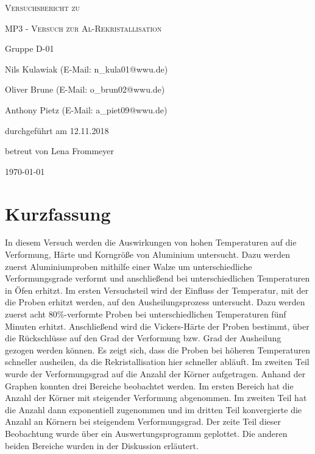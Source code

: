 \documentclass[
	a4paper,
	12pt,
	pagesize,
	ngerman
]{scrartcl}
\begin{document}
\begin{titlepage}
	\centering
	{\scshape\LARGE Versuchsbericht zu \par}
	\vspace{1cm}
	{\scshape\huge MP3 - Versuch zur Al-Rekristallisation \par}
	\vspace{2.5cm}
	{\LARGE Gruppe D-01\par}
	\vspace{0.5cm}
	{\large Nils Kulawiak (E-Mail: n\_kula01@wwu.de) \par}
	{\large Oliver Brune (E-Mail: o\_brun02@wwu.de) \par}
	{\large Anthony Pietz (E-Mail: a\_piet09@wwu.de) \par}
	\vfill
	durchgeführt am 12.11.2018\par
	
	\vfill
	betreut von Lena Frommeyer\par
	\vfill
	{\large \today\par}
\end{titlepage}

\tableofcontents
		
\newpage
\section{Kurzfassung}
In diesem Versuch werden die Auswirkungen von hohen Temperaturen auf die Verformung, Härte und Korngröße von Aluminium untersucht. 
Dazu werden zuerst Aluminiumproben mithilfe einer Walze um unterschiedliche Verformungsgrade verformt 
und anschließend bei unterschiedlichen Temperaturen in Öfen erhitzt.
Im ersten Versuchsteil wird der Einfluss der Temperatur, mit der die Proben erhitzt werden, auf den Ausheilungsprozess untersucht.
Dazu werden zuerst acht $80\%$-verformte Proben bei unterschiedlichen Temperaturen fünf Minuten erhitzt. 
Anschließend wird die Vickers-Härte der Proben bestimmt, über die Rückschlüsse auf den Grad der Verformung bzw. Grad der Ausheilung gezogen werden können. 
Es zeigt sich, dass die Proben bei höheren Temperaturen schneller ausheilen, da die Rekristallisation hier schneller abläuft.
Im zweiten Teil wurde der Verformungsgrad auf die Anzahl der Körner aufgetragen. Anhand der Graphen konnten drei Bereiche beobachtet werden. Im ersten Bereich hat die Anzahl der Körner mit steigender Verformung abgenommen. Im zweiten Teil hat die Anzahl dann exponentiell zugenommen und im dritten Teil konvergierte die Anzahl an Körnern bei steigendem Verformungsgrad. Der zeite Teil dieser Beobachtung wurde über ein Auswertungsprogramm geplottet. Die anderen beiden Bereiche wurden in der Diskussion erläutert.
\end{document}
